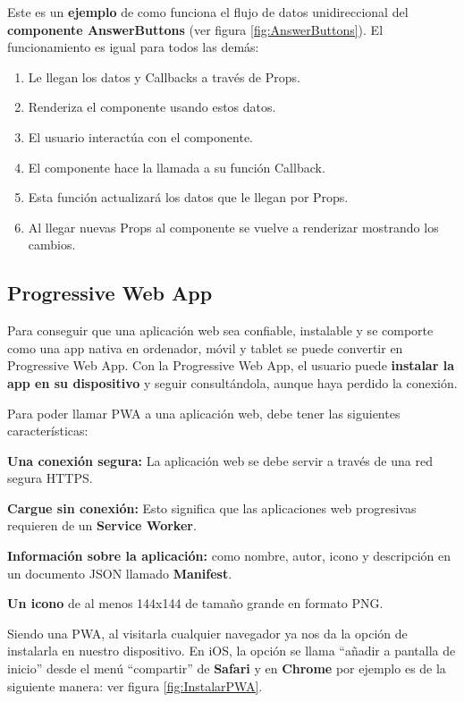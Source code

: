\documentclass[12pt,twoside,titlepage]{report}
\begin{document}
Este es un \textbf{ejemplo} de como funciona el flujo de datos unidireccional del \textbf{componente AnswerButtons} (ver figura \ref{fig:AnswerButtons}). El funcionamiento es igual para todos las demás: 

\begin{enumerate}
    \item Le llegan los datos y Callbacks a través de Props.
    \item Renderiza el componente usando estos datos.
    \item El usuario interactúa con el componente.
    \item El componente hace la llamada a su función Callback.
    \item Esta función actualizará los datos que le llegan por Props.
    \item Al llegar nuevas Props al componente se vuelve a renderizar mostrando los cambios.
\end{enumerate}


\subsection{Progressive Web App}
Para conseguir que una aplicación web sea confiable, instalable y se comporte como una app nativa en ordenador, móvil y tablet se puede convertir en Progressive Web App. Con la Progressive Web App, el usuario puede \textbf{instalar la app en su dispositivo} y seguir consultándola, aunque haya perdido la conexión.

Para poder llamar PWA a una aplicación web, debe tener las siguientes características:

\begin{compactitem}

    \item \textbf{Una conexión segura:} La aplicación web se debe servir a través de una red segura HTTPS.
    \item \textbf{Cargue sin conexión:} Esto significa que las aplicaciones web progresivas requieren de un \textbf{Service Worker}.
    \item \textbf{Información sobre la aplicación:} como nombre, autor, icono y descripción en un documento JSON llamado \textbf{Manifest}.
    \item \textbf{Un icono} de al menos 144x144 de tamaño grande en formato PNG.
\end{compactitem}

Siendo una PWA, al visitarla cualquier navegador ya nos da la opción de instalarla en nuestro dispositivo. En iOS, la opción se llama ``añadir a pantalla de inicio'' desde el menú ``compartir'' de \textbf{Safari} y en \textbf{Chrome} por ejemplo es de la siguiente manera: ver figura \ref{fig:InstalarPWA}.
\end{document}
